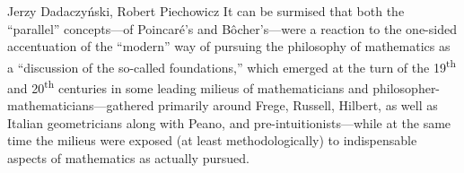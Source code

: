 \begin{artengenv}{Jerzy Dadaczyński, Robert Piechowicz}
It can be surmised that both the ``parallel'' concepts---of Poincaré's and Bôcher's---were a reaction to the one-sided accentuation of the ``modern'' way of pursuing the philosophy of mathematics as a ``discussion of the so-called foundations,'' which emerged at the turn of the 19\textsuperscript{th} and 20\textsuperscript{th} centuries in some leading milieus of mathematicians and philosopher-mathematicians---gathered primarily around Frege, Russell, Hilbert, as well as Italian geometricians along with Peano, and pre-intuitionists---while at the same time the milieus were exposed (at least methodologically) to indispensable aspects of mathematics as actually pursued.

\end{artengenv}

